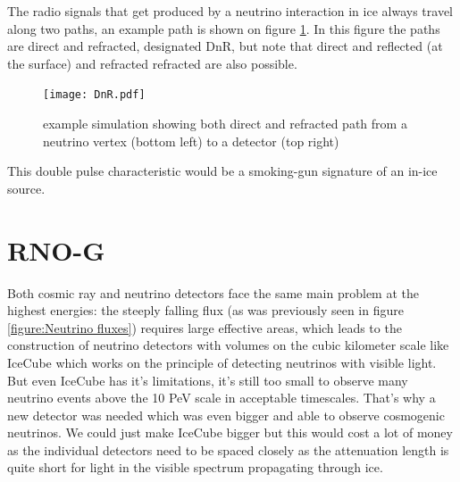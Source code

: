The radio signals that get produced by a neutrino interaction in ice always
travel along two paths, an example path is shown on figure \ref{fig:DnR}.  In
this figure the paths are direct and refracted, designated DnR, but note that
direct and reflected (at the surface) and refracted refracted are also
possible.
\begin{figure}
  \centering
  \texttt{[image: DnR.pdf]}
  \caption{example simulation showing both direct and refracted path from a neutrino vertex (bottom left) to a detector (top right)}
  \label{fig:DnR}
\end{figure}
This double pulse characteristic would be a smoking-gun signature of an in-ice
source.
\section{RNO-G}
Both cosmic ray and neutrino detectors face the same main problem at the
highest energies: the steeply falling flux (as was previously seen in figure
\ref{figure:Neutrino fluxes}) requires large effective areas, which leads to
the construction of neutrino detectors with volumes on the cubic kilometer
scale like IceCube\cite{IceCubeTechnical} which works on the principle of
detecting neutrinos with visible light.  But even IceCube has it's limitations,
it's still too small to observe many neutrino events above the 10 PeV
scale\cite{IceCubeGen2} in acceptable timescales. That's why a new detector was needed which was even
bigger and able to observe cosmogenic neutrinos.  We could just make IceCube
bigger but this would cost a lot of money as the individual detectors need to
be spaced closely as the attenuation length is quite short for light in the
visible spectrum propagating through ice.  

